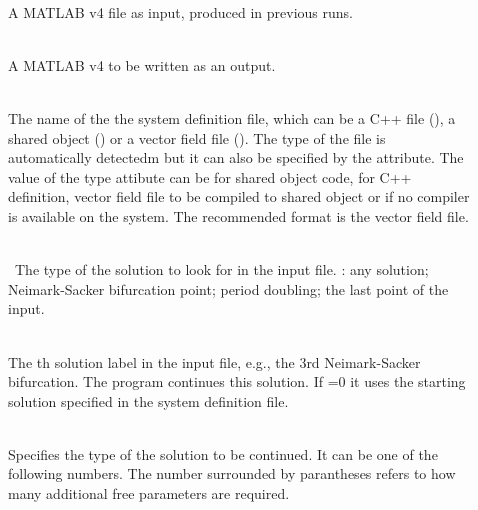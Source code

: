 \documentclass[10pt,a4paper]{ddedoc}
\begin{document}
\begin{description}
\item[] ~\\
A MATLAB v4  file as input, produced in previous runs.
\item[] ~\\
A MATLAB v4  to be written as an output.
\item[] ~\\
The name of the the system definition file, which can be a C++ file (), a shared object () or a vector field file (). The type of the file is automatically detectedm but it can also be specified by the  attribute. The value of the type attibute can be  for shared object code,  for C++ definition,  vector field file to be compiled to shared object or  if no compiler is available on the system. The recommended format is the vector field file.
%
\item[] ~\\\
The type of the solution to look for in the input file. 
: any solution;  Neimark-Sacker bifurcation point;  period doubling;  the last point of the input.
%
\item[] ~\\
The th solution label in the input file, e.g., the 3rd Neimark-Sacker bifurcation. The program continues this
solution. If \funp{label}=0 it uses the starting solution specified 
in the system definition file.
%
\item[] ~\\
Specifies the type of the solution to be continued. It can be one of the following numbers.
The number surrounded by parantheses refers to how many additional free
parameters are required.


\end{description}
\end{document}

